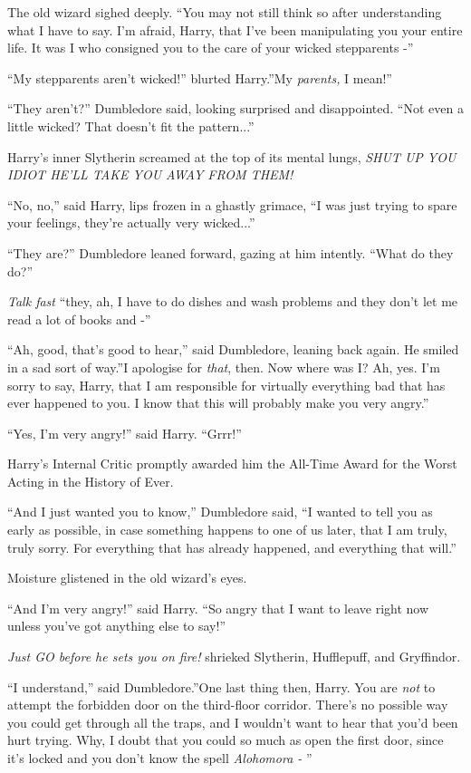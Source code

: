The old wizard sighed deeply. ``You may not still think so after
understanding what I have to say. I'm afraid, Harry, that I've been
manipulating you your entire life. It was I who consigned you to the
care of your wicked stepparents -''

``My stepparents aren't wicked!'' blurted Harry.''My \emph{parents,} I
mean!''

``They aren't?'' Dumbledore said, looking surprised and disappointed.
``Not even a little wicked? That doesn't fit the pattern...''

Harry's inner Slytherin screamed at the top of its mental lungs,
\emph{SHUT UP YOU IDIOT HE'LL TAKE YOU AWAY FROM THEM!}

``No, no,'' said Harry, lips frozen in a ghastly grimace, ``I was just
trying to spare your feelings, they're actually very wicked...''

``They are?'' Dumbledore leaned forward, gazing at him intently. ``What
do they do?''

\emph{Talk fast} ``they, ah, I have to do dishes and wash problems and
they don't let me read a lot of books and -''

``Ah, good, that's good to hear,'' said Dumbledore, leaning back again.
He smiled in a sad sort of way.''I apologise for \emph{that}, then. Now
where was I? Ah, yes. I'm sorry to say, Harry, that I am responsible for
virtually everything bad that has ever happened to you. I know that this
will probably make you very angry.''

``Yes, I'm very angry!'' said Harry. ``Grrr!''

Harry's Internal Critic promptly awarded him the All-Time Award for the
Worst Acting in the History of Ever.

``And I just wanted you to know,'' Dumbledore said, ``I wanted to tell
you as early as possible, in case something happens to one of us later,
that I am truly, truly sorry. For everything that has already happened,
and everything that will.''

Moisture glistened in the old wizard's eyes.

``And I'm very angry!'' said Harry. ``So angry that I want to leave
right now unless you've got anything else to say!''

\emph{Just GO before he sets you on fire!} shrieked Slytherin,
Hufflepuff, and Gryffindor.

``I understand,'' said Dumbledore.''One last thing then, Harry. You are
\emph{not} to attempt the forbidden door on the third-floor corridor.
There's no possible way you could get through all the traps, and I
wouldn't want to hear that you'd been hurt trying. Why, I doubt that you
could so much as open the first door, since it's locked and you don't
know the spell \emph{Alohomora -} ''

